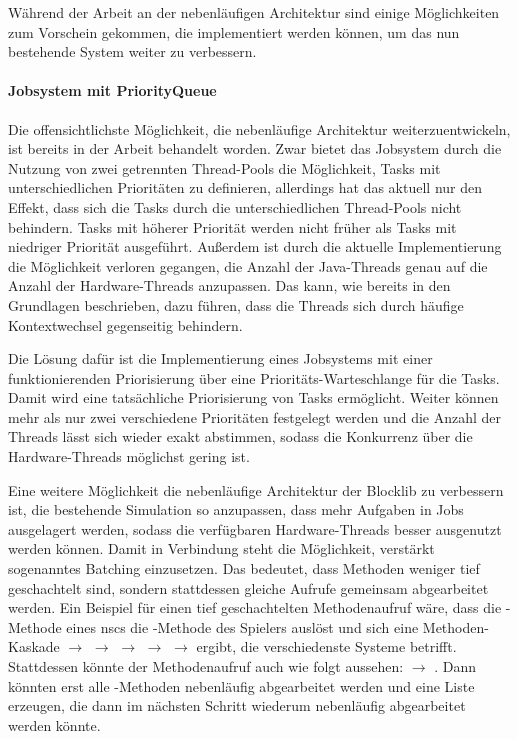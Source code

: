 Während der Arbeit an der nebenläufigen Architektur sind einige Möglichkeiten zum Vorschein gekommen, die implementiert werden können, um das nun bestehende System weiter zu verbessern.
\paragraph{Jobsystem mit PriorityQueue}
Die offensichtlichste Möglichkeit, die nebenläufige Architektur weiterzuentwickeln, ist bereits in der Arbeit behandelt worden. Zwar bietet das Jobsystem durch die Nutzung von zwei getrennten Thread-Pools die Möglichkeit, Tasks mit unterschiedlichen Prioritäten zu definieren, allerdings hat das aktuell nur den Effekt, dass sich die Tasks durch die unterschiedlichen Thread-Pools nicht behindern. Tasks mit höherer Priorität werden nicht früher als Tasks mit niedriger Priorität ausgeführt. Außerdem ist durch die aktuelle Implementierung die Möglichkeit verloren gegangen, die Anzahl der Java-Threads genau auf die Anzahl der Hardware-Threads anzupassen. Das kann, wie bereits in den Grundlagen beschrieben, dazu führen, dass die Threads sich durch häufige Kontextwechsel gegenseitig behindern.

Die Lösung dafür ist die Implementierung eines Jobsystems mit einer funktionierenden Priorisierung über eine Prioritäts-Warteschlange für die Tasks. Damit wird eine tatsächliche Priorisierung von Tasks ermöglicht. Weiter können mehr als nur zwei verschiedene Prioritäten festgelegt werden und die Anzahl der Threads lässt sich wieder exakt abstimmen, sodass die Konkurrenz über die Hardware-Threads möglichst gering ist.

Eine weitere Möglichkeit die nebenläufige Architektur der Blocklib zu verbessern ist, die bestehende Simulation so anzupassen, dass mehr Aufgaben in Jobs ausgelagert werden, sodass die verfügbaren Hardware-Threads besser ausgenutzt werden können. Damit in Verbindung steht die Möglichkeit, verstärkt sogenanntes Batching einzusetzen. Das bedeutet, dass Methoden weniger tief geschachtelt sind, sondern stattdessen gleiche Aufrufe gemeinsam abgearbeitet werden.
Ein Beispiel für einen tief geschachtelten Methodenaufruf wäre, dass die -Methode eines \acsp{nsc} die -Methode des Spielers auslöst und sich eine Methoden-Kaskade  $\to$  $\to$  $\to$  $\to$  $\to$  ergibt, die verschiedenste Systeme betrifft. Stattdessen könnte der Methodenaufruf auch wie folgt aussehen:  $\to$ . Dann könnten erst alle 
-Methoden nebenläufig abgearbeitet werden und eine Liste erzeugen, die dann im nächsten Schritt wiederum nebenläufig abgearbeitet werden könnte. 

